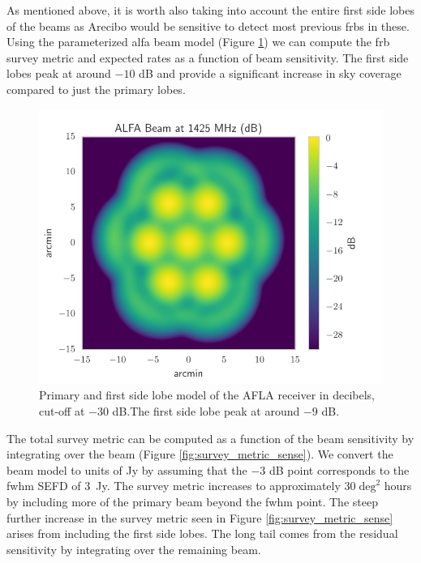 \documentclass[a4paper,fleqn,usenatbib]{mnras}
\begin{document}
As mentioned above, it is worth also taking into account the entire
first side lobes of the beams as Arecibo would be sensitive to detect
most previous \glspl{frb} in these. Using the parameterized \gls{alfa}
beam model (Figure \ref{fig:alfa_beam}) \citep{GALFAbeam} we can
compute the \gls{frb} survey metric and expected rates as a function
of beam sensitivity.  The first side lobes peak at around $-10$ dB and
provide a significant increase in sky coverage compared to just the
primary lobes.

\begin{figure}
    \includegraphics[width=1.0\linewidth]{figures/ALFA_beam_1425MHz_dB.pdf}
    \caption{Primary and first side lobe model of the AFLA receiver in
    decibels, cut-off at $-30$ dB.The first side lobe peak at around $-9$ dB.
    }
    \label{fig:alfa_beam}
\end{figure}

The total survey metric can be computed as a function of the beam
sensitivity by integrating over the beam (Figure
\ref{fig:survey_metric_sense}). We convert the beam model to units of
Jy by assuming that the $-3$ dB point corresponds to the \gls{fwhm}
SEFD of 3~Jy. The survey metric increases to approximately $30 \;
\textrm{deg}^2$ hours by including more of the primary beam beyond the
\gls{fwhm} point. The steep further increase in the survey metric seen
in Figure \ref{fig:survey_metric_sense} arises from including the
first side lobes. The long tail comes from the residual sensitivity by
integrating over the remaining beam.
\end{document}
